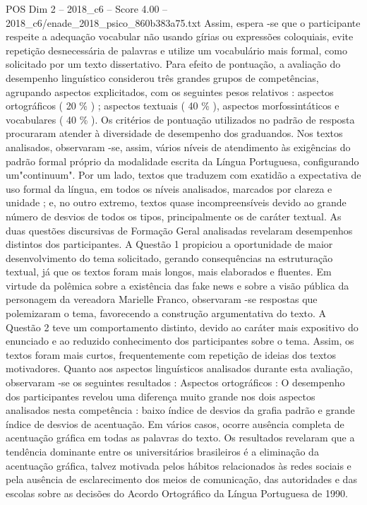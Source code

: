 \begin{textsample}{POS Dim 2 – 2018\_c6 – Score 4.00 – 2018\_c6/enade\_2018\_psico\_860b383a75.txt}
Assim, espera -se que o participante respeite a adequação vocabular não usando gírias ou expressões coloquiais, evite repetição desnecessária de palavras e utilize um vocabulário mais formal, como solicitado por um texto dissertativo.
Para efeito de pontuação, a avaliação do desempenho linguístico considerou três grandes grupos de competências, agrupando aspectos explicitados, com os seguintes pesos relativos : aspectos ortográficos ( 20 \% ) ; aspectos textuais ( 40 \% ), aspectos morfossintáticos e vocabulares ( 40 \% ).
Os critérios de pontuação utilizados no padrão de resposta procuraram atender à diversidade de desempenho dos graduandos.
Nos textos analisados, observaram -se, assim, vários níveis de atendimento às exigências do padrão formal próprio da modalidade escrita da Língua Portuguesa, configurando um"continuum".
Por um lado, textos que traduzem com exatidão a expectativa de uso formal da língua, em todos os níveis analisados, marcados por clareza e unidade ; e, no outro extremo, textos quase incompreensíveis devido ao grande número de desvios de todos os tipos, principalmente os de caráter textual.
As duas questões discursivas de Formação Geral analisadas revelaram desempenhos distintos dos participantes.
A Questão 1 propiciou a oportunidade de maior desenvolvimento do tema solicitado, gerando consequências na estruturação textual, já que os textos foram mais longos, mais elaborados e fluentes.
Em virtude da polêmica sobre a existência das fake news e sobre a visão pública da personagem da vereadora Marielle Franco, observaram -se respostas que polemizaram o tema, favorecendo a construção argumentativa do texto.
A Questão 2 teve um comportamento distinto, devido ao caráter mais expositivo do enunciado e ao reduzido conhecimento dos participantes sobre o tema.
Assim, os textos foram mais curtos, frequentemente com repetição de ideias dos textos motivadores.
Quanto aos aspectos linguísticos analisados durante esta avaliação, observaram -se os seguintes resultados : Aspectos ortográficos : O desempenho dos participantes revelou uma diferença muito grande nos dois aspectos analisados nesta competência : baixo índice de desvios da grafia padrão e grande índice de desvios de acentuação.
Em vários casos, ocorre ausência completa de acentuação gráfica em todas as palavras do texto.
Os resultados revelaram que a tendência dominante entre os universitários brasileiros é a eliminação da acentuação gráfica, talvez motivada pelos hábitos relacionados às redes sociais e pela ausência de esclarecimento dos meios de comunicação, das autoridades e das escolas sobre as decisões do Acordo Ortográfico da Língua Portuguesa de 1990.

\end{textsample}
